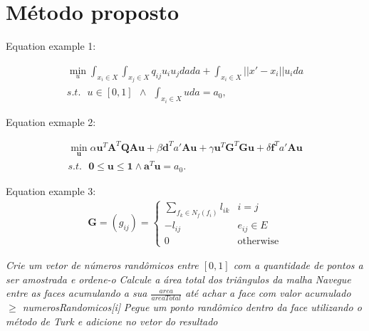 \chapter{Método proposto}
\label{cha:Método proposto}

Equation example 1:

\begin{equation}
\begin{split}
\min_u \int_{x_i\in X}\int_{x_j\in X} q_{ij} u_i u_j da da + \int_{x_i\in X}||x' - x_i|| u_i da \\
s.t. \ \ \ u\in[0,1] \ \ \land  \ \ \int_{x_i\in X}u da = a_0,
\end{split}
\end{equation}

Equation exmaple 2:

\begin{equation}
\begin{split}
\min_{\mathbf{u}} \alpha \mathbf{u}^T \mathbf{A}^T \mathbf{Q} \mathbf{A} \mathbf{u} +  \beta \mathbf{d}^T a' \mathbf{A} \mathbf{u} + \gamma \mathbf{u}^T \mathbf{G}^T \mathbf{G} \mathbf{u} + \delta\mathbf{f}^T a' \mathbf{A} \mathbf{u} \\
s.t. \ \ \ \mathbf{0} \leq \mathbf{u} \leq \mathbf{1} \land \mathbf{a}^T\mathbf{u}=a_0.
\end{split}
\end{equation}

Equation example 3:
\begin{align}
\mathbf{G}=(g_{ij}) = \left\lbrace
\begin{array}{ll}
\sum_{f_k\in N_f(f_i)} l_{ik} & i=j\\
-l_{ij} & e_{ij}\in E\\
0 & \text{otherwise}
\end{array}
\right.
\end{align}



\begin{algorithm}
\DontPrintSemicolon
{}
\BlankLine
\emph{Crie um vetor de números randômicos entre $[0,1]$ com a quantidade de pontos a ser amostrada e ordene-o}\;
\emph{Calcule a área total dos triângulos da malha}\;
 {
  \emph{Navegue entre as faces acumulando a sua $\frac{area}{areaTotal}$ até achar a face com valor acumulado $\geqslant$ numerosRandomicos[i]}\;
  \emph{Pegue um ponto randômico dentro da face utilizando o método de Turk e adicione no vetor do resultado}\;
}
\caption{Escolha das amostras inicias}\label{alg:sampling}
\end{algorithm}\DecMargin{1em}

